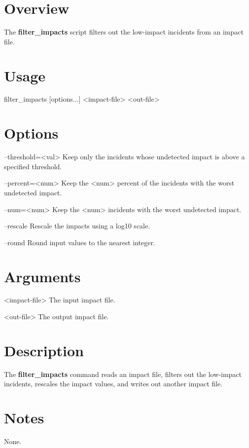 
\section{Overview}\label{filter_impactsExecutable_filter_impactsOverview}

The {\bfseries filter\_\-impacts} script filters out the low-\/impact incidents from an impact file.

\section{Usage}\label{filter_impactsExecutable_filter_impactsUsage}

\begin{verb}
   filter_impacts [options...] <impact-file> <out-file>
\end{verb}

\section{Options}\label{filter_impactsExecutable_filter_impactsOptions}

\begin{verb}
    --threshold=<val>
	   Keep only the incidents whose undetected impact is above a 
	   specified threshold.

    --percent=<num>
	   Keep the <num> percent of the incidents with the worst  
	   undetected impact.

    --num=<num>
	   Keep the <num> incidents with the worst  
	   undetected impact.

    --rescale
	   Rescale the impacts using a log10 scale.

    --round
	   Round input values to the nearest integer.
\end{verb}

\section{Arguments}\label{filter_impactsExecutable_filter_impactsArguments}

\begin{verb}
    <impact-file>
	   The input impact file.

    <out-file>
	   The output impact file.
\end{verb}

\section{Description}\label{filter_impactsExecutable_filter_impactsDescription}

The {\bfseries filter\_\-impacts} command reads an impact file, filters out the low-\/impact incidents, rescales the impact values, and writes out another impact file.

\section{Notes}\label{filter_impactsExecutable_filter_Notes}

None. 
